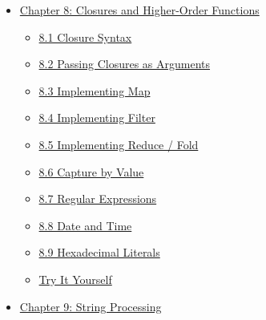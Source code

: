 \documentclass[
  english,
]{book}
\providecommand{\tightlist}{%
  \setlength{\itemsep}{0pt}\setlength{\parskip}{0pt}}
\begin{document}
\begin{itemize}
  \begin{itemize}
  \tightlist
  \item
    \hyperref[71-trait-declarations]{7.1 Trait Declarations}
  \item
    \hyperref[72-implementing-traits]{7.2 Implementing Traits}
  \item
    \hyperref[73-generic-functions]{7.3 Generic Functions}
  \item
    \hyperref[74-trait-constraints-where]{7.4 Trait Constraints
    (\texttt{where})}
  \item
    \hyperref[try-it-yourself]{Try It Yourself}
  \end{itemize}
\item
  \hyperref[chapter-8-closures-and-higher-order-functions]{Chapter 8:
  Closures and Higher-Order Functions}

  \begin{itemize}
  \tightlist
  \item
    \hyperref[81-closure-syntax]{8.1 Closure Syntax}
  \item
    \hyperref[82-passing-closures-as-arguments]{8.2 Passing Closures as
    Arguments}
  \item
    \hyperref[83-implementing-map]{8.3 Implementing Map}
  \item
    \hyperref[84-implementing-filter]{8.4 Implementing Filter}
  \item
    \hyperref[85-implementing-reduce--fold]{8.5 Implementing Reduce /
    Fold}
  \item
    \hyperref[86-capture-by-value]{8.6 Capture by Value}
  \item
    \hyperref[87-regular-expressions]{8.7 Regular Expressions}
  \item
    \hyperref[88-date-and-time]{8.8 Date and Time}
  \item
    \hyperref[89-hexadecimal-literals]{8.9 Hexadecimal Literals}
  \item
    \hyperref[try-it-yourself]{Try It Yourself}
  \end{itemize}
\item
  \hyperref[chapter-9-string-processing]{Chapter 9: String Processing}


\end{itemize}
\end{document}
